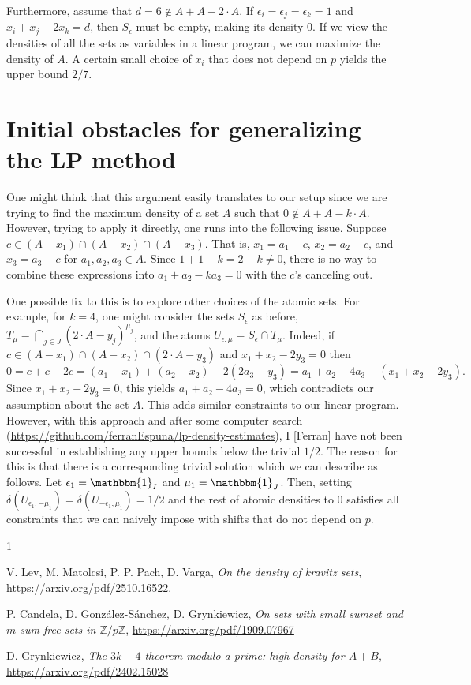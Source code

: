 \documentclass[a4paper,12pt,reqno]{amsart}
\newcommand{\1}{\mathbf{1}}
\newcommand{\0}{\mathbf{0}}
\theoremstyle{definition}
\newcommand{\mb}{\mathbb}
\begin{document}
Furthermore, assume that $d = 6 \notin A + A - 2 \cdot A$. If $\epsilon_i = \epsilon_j = \epsilon_k = 1$ and $x_i + x_j - 2x_k = d$, then $S_\epsilon$ must be empty, making its density 0. If we view the densities of all the sets as variables in a linear program, we can maximize the density of $A$. A certain small choice of $x_i$ that does not depend on $p$ yields the upper bound $2/7$.

\section{Initial obstacles for generalizing the LP method}

One might think that this argument easily translates to our setup since we are trying to find the maximum density of a set $A$ such that $0 \notin A + A - k \cdot A$. However, trying to apply it directly, one runs into the following issue. Suppose $c \in (A - x_1) \cap (A - x_2) \cap (A - x_3)$. That is, $x_1 = a_1 - c$, $x_2 = a_2 - c$, and $x_3 = a_3 - c$ for $a_1, a_2, a_3 \in A$. Since $1 + 1 - k = 2 - k \neq 0$, there is no way to combine these expressions into $a_1 + a_2 - ka_3 = 0$ with the $c$'s canceling out.

One possible fix to this is to explore other choices of the atomic sets. For example, for $k = 4$, one might consider the sets $S_{\epsilon}$ as before, $T_{\mu} = \bigcap_{j \in J}(2 \cdot A - y_j)^{\mu_j}$, and the atoms $U_{\epsilon, \mu} = S_{\epsilon}\cap T_{\mu}$. Indeed,
if $c \in (A - x_1) \cap (A - x_2) \cap (2 \cdot A - y_3)$ and $x_1 + x_2 - 2y_3 = 0$ then
\[
    0 = c + c - 2c = (a_1 - x_1) + (a_2 - x_2) - 2(2a_3 - y_3) = a_1 + a_2 - 4a_3 - (x_1 + x_2 - 2y_3).
\]
Since $x_1 + x_2 - 2y_3 = 0$, this yields $a_1 + a_2 - 4a_3 = 0$, which contradicts our assumption about the set $A$. This adds similar constraints to our linear program. However, with this approach and after some computer search (\url{https://github.com/ferranEspuna/lp-density-estimates}), I [Ferran] have not been successful in establishing any upper bounds below the trivial $1/2$.
The reason for this is that there is a corresponding trivial solution which we can describe as follows. Let $\epsilon_1 = \mathbbm{1}_{I}$ and $\mu_{1} = \mathbbm{1}_{J}$. Then, setting $\delta(U_{\epsilon_1, -\mu_1}) = \delta(U_{-\epsilon_1, \mu_1}) = 1/2$ and the rest of atomic densities to $0$ satisfies all constraints that we can naively impose with shifts that do not depend on $p$.



\begin{thebibliography}{1}

 V. Lev, M. Matolcsi, P. P. Pach, D. Varga,   \emph{On the density of kravitz sets}, \url{https://arxiv.org/pdf/2510.16522}.

 P. Candela, D. González-Sánchez, D. Grynkiewicz, \emph{On sets with small sumset and $m$-sum-free sets in $\mb{Z}/p\mb{Z}$}, 
\url{https://arxiv.org/pdf/1909.07967}

 D. Grynkiewicz, \emph{The $3k-4$ theorem modulo a prime: high density for $A+B$}, 
\url{https://arxiv.org/pdf/2402.15028}

\end{thebibliography}
\end{document}

